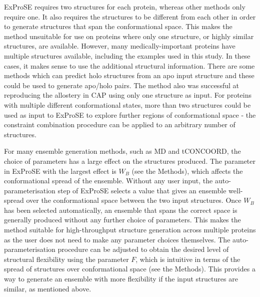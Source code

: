 ExProSE requires two structures for each protein, whereas other methods only require one.
It also requires the structures to be different from each other in order to generate structures that span the conformational space.
This makes the method unsuitable for use on proteins where only one structure, or highly similar structures, are available.
However, many medically-important proteins have multiple structures available, including the examples used in this study.
In these cases, it makes sense to use the additional structural information.
There are some methods which can predict holo structures from an apo input structure \cite{Seeliger2010, Grove2013} and these could be used to generate apo/holo pairs.
The method also was successful at reproducing the allostery in CAP using only one structure as input.
For proteins with multiple different conformational states, more than two structures could be used as input to ExProSE to explore further regions of conformational space - the constraint combination procedure can be applied to an arbitrary number of structures.

For many ensemble generation methods, such as MD and tCONCOORD, the choice of parameters has a large effect on the structures produced.
The parameter in ExProSE with the largest effect is $W_{B}$ (see the Methods), which affects the conformational spread of the ensemble.
Without any user input, the auto-parameterisation step of ExProSE selects a value that gives an ensemble well-spread over the conformational space between the two input structures.
Once $W_{B}$ has been selected automatically, an ensemble that spans the correct space is generally produced without any further choice of parameters.
This makes the method suitable for high-throughput structure generation across multiple proteins as the user does not need to make any parameter choices themselves.
The auto-parameterisation procedure can be adjusted to obtain the desired level of structural flexibility using the parameter $F$, which is intuitive in terms of the spread of structures over conformational space (see the Methods).
This provides a way to generate an ensemble with more flexibility if the input structures are similar, as mentioned above.

